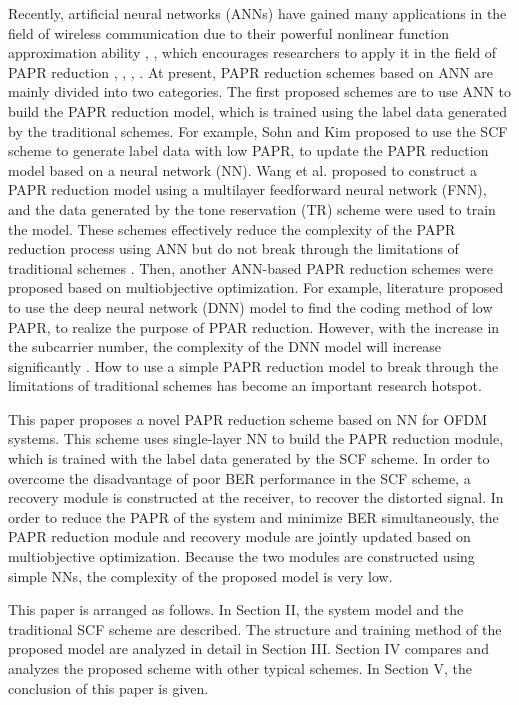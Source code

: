 \documentclass[journal]{IEEEtran}
\begin{document}
Recently, artificial neural networks (ANNs) have gained many applications in the field of wireless communication due to their powerful nonlinear function approximation ability \cite{b18}, \cite{b19}, which encourages researchers to apply it in the field of PAPR reduction \cite{b8}, \cite{b11}, \cite{b13}, \cite{b20}. At present, PAPR reduction schemes based on ANN are mainly divided into two categories. The first proposed schemes are to use ANN to build the PAPR reduction model, which is trained using the label data generated by the traditional schemes. For example, Sohn and Kim \cite{b13} proposed to use the SCF scheme to generate label data with low PAPR, to update the PAPR reduction model based on a neural network (NN). Wang et al. \cite{b20} proposed to construct a PAPR reduction model using a multilayer feedforward neural network (FNN), and the data generated by the tone reservation (TR) scheme were used to train the model. These schemes effectively reduce the complexity of the PAPR reduction process using ANN but do not break through the limitations of traditional schemes \cite{b11}. Then, another ANN-based PAPR reduction schemes were proposed based on multiobjective optimization. For example, literature \cite{b11} proposed to use the deep neural network (DNN) model to find the coding method of low PAPR, to realize the purpose of PPAR reduction. However, with the increase in the subcarrier number, the complexity of the DNN model will increase significantly \cite{b8}. How to use a simple PAPR reduction model to break through the limitations of traditional schemes has become an important research hotspot.

This paper proposes a novel PAPR reduction scheme based on NN for OFDM systems. This scheme uses single-layer NN to build the PAPR reduction module, which is trained with the label data generated by the SCF scheme. In order to overcome the disadvantage of poor BER performance in the SCF scheme, a recovery module is constructed at the receiver, to recover the distorted signal. In order to reduce the PAPR of the system and minimize BER simultaneously, the PAPR reduction module and recovery module are jointly updated based on multiobjective optimization. Because the two modules are constructed using simple NNs, the complexity of the proposed model is very low.

This paper is arranged as follows. In Section II, the system model and the traditional SCF scheme are described. The structure and training method of the proposed model are analyzed in detail in Section III. Section IV compares and analyzes the proposed scheme with other typical schemes. In Section V, the conclusion of this paper is given.
\end{document}
